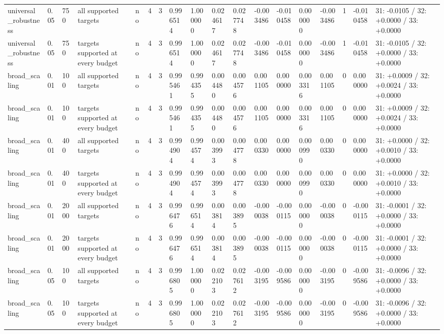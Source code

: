 \begin{tabular}{llllllllllllllllll}
universal\_robustness & 0.05 & 750 & all supported targets & no & 4 & 3 & 0.996514 & 1.000000 & 0.024617 & 0.027748 & -0.003486 & -0.010458 & 0.000000 & -0.003486 & 1 & -0.010458 & 31: -0.0105 / 32: +0.0000 / 33: +0.0000 \\
universal\_robustness & 0.05 & 750 & targets supported at every budget & no & 4 & 3 & 0.996514 & 1.000000 & 0.024617 & 0.027748 & -0.003486 & -0.010458 & 0.000000 & -0.003486 & 1 & -0.010458 & 31: -0.0105 / 32: +0.0000 / 33: +0.0000 \\
broad\_scaling & 0.01 & 100 & all supported targets & no & 4 & 3 & 0.995461 & 0.994355 & 0.004480 & 0.004576 & 0.001105 & 0.000000 & 0.003316 & 0.001105 & 0 & 0.000000 & 31: +0.0009 / 32: +0.0024 / 33: +0.0000 \\
broad\_scaling & 0.01 & 100 & targets supported at every budget & no & 4 & 3 & 0.995461 & 0.994355 & 0.004480 & 0.004576 & 0.001105 & 0.000000 & 0.003316 & 0.001105 & 0 & 0.000000 & 31: +0.0009 / 32: +0.0024 / 33: +0.0000 \\
broad\_scaling & 0.01 & 400 & all supported targets & no & 4 & 3 & 0.994904 & 0.994574 & 0.003993 & 0.004778 & 0.000330 & 0.000000 & 0.000990 & 0.000330 & 0 & 0.000000 & 31: +0.0000 / 32: +0.0010 / 33: +0.0000 \\
broad\_scaling & 0.01 & 400 & targets supported at every budget & no & 4 & 3 & 0.994904 & 0.994574 & 0.003993 & 0.004778 & 0.000330 & 0.000000 & 0.000990 & 0.000330 & 0 & 0.000000 & 31: +0.0000 / 32: +0.0010 / 33: +0.0000 \\
broad\_scaling & 0.01 & 2000 & all supported targets & no & 4 & 3 & 0.996476 & 0.996514 & 0.003814 & 0.003895 & -0.000038 & -0.000115 & 0.000000 & -0.000038 & 0 & -0.000115 & 31: -0.0001 / 32: +0.0000 / 33: +0.0000 \\
broad\_scaling & 0.01 & 2000 & targets supported at every budget & no & 4 & 3 & 0.996476 & 0.996514 & 0.003814 & 0.003895 & -0.000038 & -0.000115 & 0.000000 & -0.000038 & 0 & -0.000115 & 31: -0.0001 / 32: +0.0000 / 33: +0.0000 \\
broad\_scaling & 0.05 & 100 & all supported targets & no & 4 & 3 & 0.996805 & 1.000000 & 0.022103 & 0.027612 & -0.003195 & -0.009586 & 0.000000 & -0.003195 & 0 & -0.009586 & 31: -0.0096 / 32: +0.0000 / 33: +0.0000 \\
broad\_scaling & 0.05 & 100 & targets supported at every budget & no & 4 & 3 & 0.996805 & 1.000000 & 0.022103 & 0.027612 & -0.003195 & -0.009586 & 0.000000 & -0.003195 & 0 & -0.009586 & 31: -0.0096 / 32: +0.0000 / 33: +0.0000 \\

\end{tabular}
